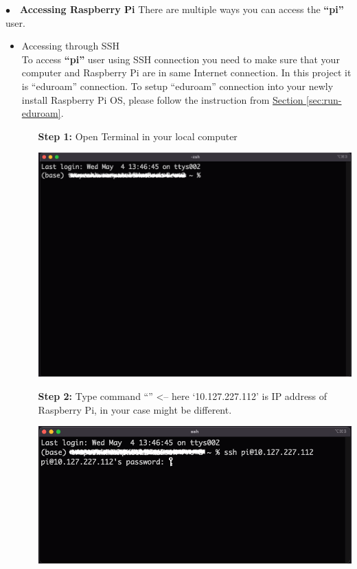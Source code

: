 \noindent$\bullet$~~\textbf{Accessing Raspberry Pi}	\label{subsubsec:ssh}
		There are multiple ways you can access the \textbf{``pi''} user.  
		\begin{itemize}[leftmargin=1.2cm]
			\item Accessing through SSH \\
				To access \textbf{``pi''} user using SSH connection you need to make sure that your computer and Raspberry Pi are in same Internet connection. In this project it is ``eduroam'' connection. To setup ``eduroam'' connection into your newly install Raspberry Pi OS, please follow the instruction from \hyperref[sec:run-eduroam]{Section \ref{sec:run-eduroam}}.
				\begin{itemize}[leftmargin=1.3cm]
					\item[\textbf{Step 1:}] Open Terminal in your local computer \\
						\begin{minipage}{\textwidth}
							\vspace{2mm}
							\includegraphics[scale=0.18]{Images/raspberry_pi/ssh_login/open_iterm.png}
							\vspace{2mm}
						\end{minipage}
					\item[\textbf{Step 2:}] Type command ``{\selectfont{ssh pi@10.127.227.11\\2}}'' <-- here `10.127.227.112' is IP address of Raspberry Pi, in your case might be different.\\
						\begin{minipage}{\textwidth}
							\vspace{2mm}
							\includegraphics[scale=0.205]{Images/raspberry_pi/ssh_login/login.png}

\end{minipage}
\end{itemize}
\end{itemize}
